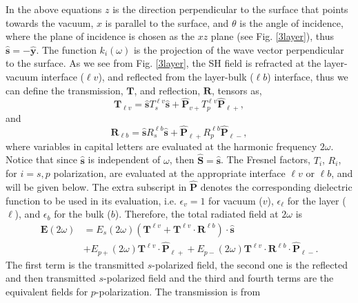 In the above equations $z$ is the direction perpendicular to the surface that
points towards the vacuum, $x$ is parallel to the surface, and $\theta$ is the
angle of incidence, where the plane of incidence is chosen as the $xz$ plane
(see Fig. \ref{3layer}), thus $\hat{\mathbf{s}}=-\hat{\mathbf{y}}$. The
function $k_i(\omega)$ is the projection of the wave vector perpendicular to
the surface. As we see from Fig. \ref{3layer}, the SH field is refracted at the
layer-vacuum interface ($\ell v$), and reflected from the layer-bulk ($\ell b$)
interface, thus we can define the transmission, $\mathbf{T}$, and reflection,
$\mathbf{R}$, tensors as,
\begin{equation*}\label{r5}
\mathbf{T}_{\ell v}
= \hat{\mathbf{s}}T_s^{\ell v}\hat{\mathbf{s}} 
+ \hat{\mathbf{P}}_{v+}T_{p}^{\ell v} \hat{\mathbf{P}}_{\ell +},
\end{equation*}
and
\begin{equation*}\label{r6}
\mathbf{R}_{\ell b}
= \hat{\mathbf{s}}R_s^{\ell b}\hat{\mathbf{s}}
+ \hat{\mathbf{P}}_{\ell +}R_{p}^{\ell b} \hat{\mathbf{P}}_{\ell -},
\end{equation*}
where variables in capital letters are evaluated at the harmonic frequency
$2\omega$. Notice that since $\hat{\mathbf{s}}$ is independent of $\omega$,
then $\hat{\mathbf{S}}=\hat{\mathbf{s}}$. The Fresnel factors, $T_i$, $R_i$,
for $i=s,p$ polarization, are evaluated at the appropriate interface $\ell v$
or $\ell b$, and will be given below. The extra subscript in $\hat{\mathbf{P}}$
denotes the corresponding dielectric function to be used in its evaluation,
i.e. $\epsilon_v=1$ for vacuum ($v$), $\epsilon_{\ell}$ for the layer ($\ell$),
and $\epsilon_{b}$ for the bulk ($b$). Therefore, the total radiated field at
$2\omega$ is
\begin{equation*}\label{r7}
\begin{split}
\mathbf{E}(2\omega)
&= E_s(2\omega)
\left(
\mathbf{T}^{\ell v} + \mathbf{T}^{\ell v}\cdot\mathbf{R}^{\ell b}
\right)
\cdot\hat{\mathbf{s}}\nonumber\\
&+ E_{p+}(2\omega)\mathbf{T}^{\ell v}\cdot\hat{\mathbf{P}}_{\ell +}
 + E_{p-}(2\omega)\mathbf{T}^{\ell v}
\cdot\mathbf{R}^{\ell b}\cdot\hat{\mathbf{P}}_{\ell-}.
\end{split}
\end{equation*}
The first term is  the transmitted $s$-polarized field, the second one is the
reflected and then transmitted $s$-polarized field and the third and fourth
terms are the equivalent fields for $p$-polarization. The transmission is from
